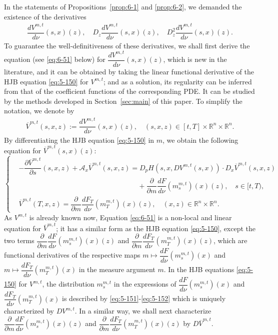 \documentclass[11pt]{article}
\numberwithin{equation}{section}
\newcommand{\brn}{{\mathbb{R}^n}}
\newcommand{\1}{\mbox{1\hspace{-1mm}I}}
\begin{document}
In the statements of Propositions~\ref{prop:6-1} and \ref{prop:6-2}, we demanded the existence of the derivatives 
\begin{align*}
    \dfrac{dV^{m,t}}{d\nu}(s,x)(z),\quad D_{z}\dfrac{dV^{m,t}}{d\nu}(s,x)(z),\quad D_{z}^{2}\dfrac{dV^{m,t}}{d\nu}(s,x)(z).
\end{align*}
To guarantee the well-definitiveness of these derivatives, we shall first derive the equation (see \eqref{eq:6-51} below) for $\dfrac{dV^{m,t}}{d\nu}(s,x)(z)$, which is new in the literature, and it can be obtained by taking the linear functional derivative of the HJB equation \eqref{eq:5-150} for $V^{m,t}$; and as a solution, its regularity can be inferred from that of the coefficient functions of the corresponding PDE. It can be studied by the methods developed in Section~\ref{sec:main} of this paper. %
To simplify the notation, we denote by 
\begin{align*}
    \overline{V}^{m,t}(s,x,z):=\dfrac{dV^{m,t}}{d\nu}(s,x)(z),\quad (s,x,z)\in[t,T]\times\brn\times\brn. 
\end{align*}
By differentiating the HJB equation \ref{eq:5-150} in $m$, we obtain the following equation for $\overline{V}^{m,t}(s,x)(z)$: 
\begin{equation}\label{eq:6-51}
    \left\{
    \begin{aligned}
        &-\dfrac{\partial \overline{V}^{m,t}}{\partial s}(s,x,z)+\mathcal{A}_{x}\overline{V}^{m,t}(s,x,z)=D_{p}H\left(s,x,DV^{m,t}(s,x)\right)\cdot D_{x}\overline{V}^{m,t}(s,x,z)\\
        &\quad\qquad\qquad\qquad\qquad\qquad\qquad\qquad\qquad +\dfrac{\partial}{\partial m}\dfrac{dF}{d\nu}\left(m^{m,t}_s\right)(x)(z),\quad s\in[t,T),\\
        &\overline{V}^{m,t}(T,x,z)=\dfrac{\partial}{\partial m}\dfrac{dF_{T}}{d\nu}\left(m^{m,t}_T\right)(x)(z),\quad (x,z)\in\brn\times\brn.
    \end{aligned}
    \right.
\end{equation}
As $V^{m,t}$ is already known now, Equation \eqref{eq:6-51} is a non-local and linear equation for $\overline{V}^{m,t}$; it has a similar form as the HJB equation \ref{eq:5-150}, except the two terms $\dfrac{\partial}{\partial m}\dfrac{dF}{d\nu}\left(m^{m,t}_s\right)(x)(z)$ and $\dfrac{\partial}{\partial m}\dfrac{dF_{T}}{d\nu}\left(m^{m,t}_T\right)(x)(z)$, which are functional derivatives of the respective maps $m \mapsto \dfrac{dF}{d\nu}\left(m^{m,t}_s\right)(x)$ and $m \mapsto \dfrac{dF_T}{d\nu}\left(m^{m,t}_T\right)(x)$ in the measure argument $m$. In the HJB equations \eqref{eq:5-150} for $V^{m,t}$, the distribution $m_s^{m,t}$ in the expressions of $\dfrac{dF}{d\nu}\left(m^{m,t}_s\right)(x)$ and $\dfrac{dF_T}{d\nu}\left(m^{m,t}_T\right)(x)$ is described by \eqref{eq:5-151}-\eqref{eq:5-152} which is uniquely characterized by $DV^{m,t}$. In a similar way, we shall next characterize $\dfrac{\partial}{\partial m}\dfrac{dF}{d\nu}\left(m^{m,t}_s\right)(x)(z)$ and $\dfrac{\partial}{\partial m}\dfrac{dF_{T}}{d\nu}\left(m^{m,t}_T\right)(x)(z)$  by $D\overline{V}^{m,t}$. 
\end{document}
